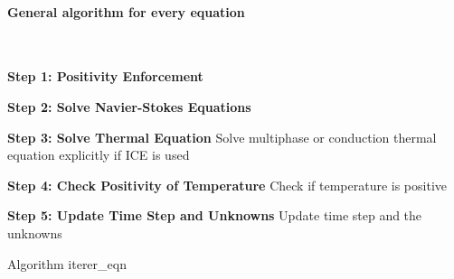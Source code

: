\paragraph{General algorithm for every equation}\mbox{}\\
\begin{algorithm}[H]
  \SetAlgoLined
  
  \BlankLine
  \textbf{Step 1: Positivity Enforcement}\;
  
  \BlankLine
  \textbf{Step 2: Solve Navier-Stokes Equations}\;
  
  \BlankLine
  \textbf{Step 3: Solve Thermal Equation}\;
  Solve multiphase or conduction thermal equation explicitly if ICE is used\;
  
  \BlankLine
  \textbf{Step 4: Check Positivity of Temperature}\;
  Check if temperature is positive\;
  
  \BlankLine
  \textbf{Step 5: Update Time Step and Unknowns}\;
  Update time step and the unknowns\;
  
  \caption{Algorithm iterer_eqn}
\end{algorithm}

